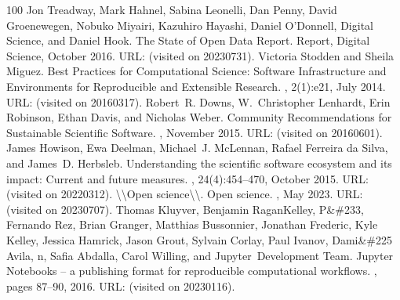 \documentclass[letterpaper,table,10pt,english]{jupyterBook}
\begin{document}
\begin{sphinxthebibliography}{100}
\sphinxAtStartPar
Jon Treadway, Mark Hahnel, Sabina Leonelli, Dan Penny, David Groenewegen, Nobuko Miyairi, Kazuhiro Hayashi, Daniel O'Donnell, Digital Science, and Daniel Hook. The State of Open Data Report. Report, Digital Science, October 2016. URL:  (visited on 2023\sphinxhyphen{}07\sphinxhyphen{}31).
\sphinxAtStartPar
Victoria Stodden and Sheila Miguez. Best Practices for Computational Science: Software Infrastructure and Environments for Reproducible and Extensible Research. , 2(1):e21, July 2014. URL:  (visited on 2016\sphinxhyphen{}03\sphinxhyphen{}17).
\sphinxAtStartPar
Robert R. Downs, W. Christopher Lenhardt, Erin Robinson, Ethan Davis, and Nicholas Weber. Community Recommendations for Sustainable Scientific Software. , November 2015. URL:  (visited on 2016\sphinxhyphen{}06\sphinxhyphen{}01).
\sphinxAtStartPar
James Howison, Ewa Deelman, Michael J. McLennan, Rafael Ferreira da Silva, and James D. Herbsleb. Understanding the scientific software ecosystem and its impact: Current and future measures. , 24(4):454–470, October 2015. URL:  (visited on 2022\sphinxhyphen{}03\sphinxhyphen{}12).
\sphinxAtStartPar
\textbackslash{}\textbackslash{}Open science\textbackslash{}\textbackslash{}. Open science. , May 2023. URL:  (visited on 2023\sphinxhyphen{}07\sphinxhyphen{}07).
\sphinxAtStartPar
Thomas Kluyver, Benjamin Ragan\sphinxhyphen{}Kelley, P\&\#233, Fernando Rez, Brian Granger, Matthias Bussonnier, Jonathan Frederic, Kyle Kelley, Jessica Hamrick, Jason Grout, Sylvain Corlay, Paul Ivanov, Dami\&\#225 Avila, n, Safia Abdalla, Carol Willing, and Jupyter Development Team. Jupyter Notebooks – a publishing format for reproducible computational workflows. , pages 87–90, 2016. URL:  (visited on 2023\sphinxhyphen{}01\sphinxhyphen{}16).

\end{sphinxthebibliography}
\end{document}

